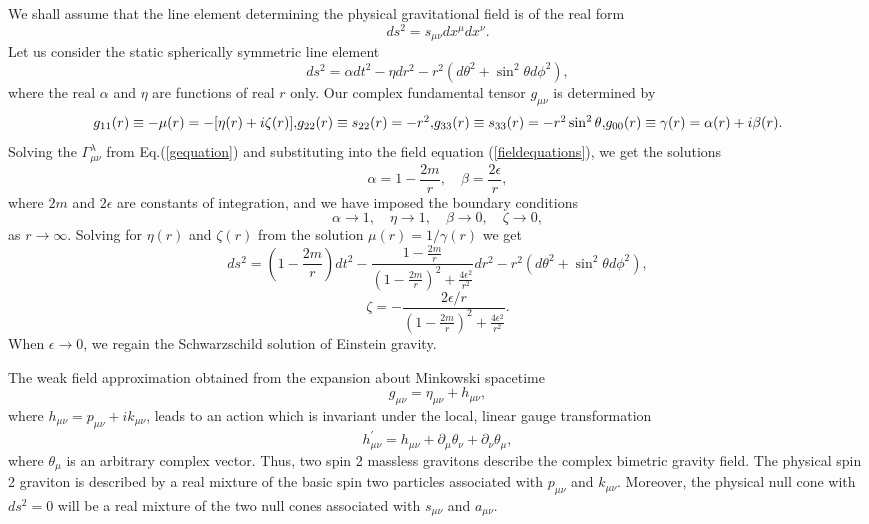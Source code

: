 \documentclass[a4paper,10pt]{article}
\begin{document}
We shall assume that the line element determining the physical
gravitational field is of the real form
\begin{equation}
\label{realmetric}
ds^2=s_{\mu\nu}dx^\mu dx^\nu.
\end{equation}
Let us consider the static spherically symmetric line element
\begin{equation}
ds^2=\alpha dt^2-\eta dr^2-r^2(d\theta^2+\sin^2\theta d\phi^2),
\end{equation}
where the real $\alpha$ and $\eta$ are functions of real $r$
only. Our complex fundamental tensor $g_{\mu\nu}$ is determined
by \begin{equation}
g_{11}(r)\equiv -\mu(r)=-[\eta(r)+i\zeta(r)],
$$
$$
g_{22}(r)\equiv s_{22}(r)=-r^2,
$$
$$
g_{33}(r)\equiv s_{33}(r)=-r^2\sin^2\theta,
$$
$$
g_{00}(r)\equiv \gamma(r)=\alpha(r)+i\beta(r).
\end{equation}
Solving the $\Gamma^\lambda_{\mu\nu}$ from Eq.(\ref{gequation}) and substituting
into the field equation (\ref{fieldequations}), we get the solutions
\begin{equation}
\alpha=1-\frac{2m}{r},\quad \beta=\frac{2\epsilon}{r},
\end{equation}
where $2m$ and $2\epsilon$ are constants of integration, and we have imposed the
boundary conditions
\begin{equation}
\alpha\rightarrow 1,\quad \eta\rightarrow 1,\quad \beta\rightarrow 0,\quad
\zeta\rightarrow 0,
\end{equation}
as $r\rightarrow\infty$. Solving for $\eta(r)$ and $\zeta(r)$ from the
solution $\mu(r)=1/\gamma(r)$ we get~\cite{Moffat3}
\begin{equation}
ds^2= (1-\frac{2m}{r})dt^2
-\frac{1-\frac{2m}{r}}{(1-\frac{2m}{r})^2+\frac{4\epsilon^2}{r^2}}dr^2
-r^2(d\theta^2+\sin^2\theta d\phi^2),
\end{equation}
\begin{equation}
\zeta=-\frac{2\epsilon/r}{(1-\frac{2m}{r})^2+\frac{4\epsilon^2}{r^2}}.
\end{equation}
When $\epsilon\rightarrow 0$, we regain the Schwarzschild solution of Einstein
gravity.

The weak field approximation obtained from the expansion about Minkowski
spacetime
\begin{equation}
g_{\mu\nu}=\eta_{\mu\nu}+h_{\mu\nu},
\end{equation}
where $h_{\mu\nu}=p_{\mu\nu}+ik_{\mu\nu}$, leads to an action
which is invariant under the local, linear gauge transformation
\begin{equation}
h^\prime_{\mu\nu}=h_{\mu\nu}+\partial_\mu\theta_\nu+\partial_\nu\theta_\mu,
\end{equation}
where $\theta_\mu$ is an arbitrary complex vector. Thus, two spin 2 massless
gravitons describe the complex bimetric gravity field. The physical spin 2 graviton
is described by a real mixture of the basic spin two particles associated with
$p_{\mu\nu}$ and $k_{\mu\nu}$. Moreover, the physical null cone with
$ds^2=0$ will be a real mixture of the two null cones associated with
$s_{\mu\nu}$ and $a_{\mu\nu}$.
\end{document}
